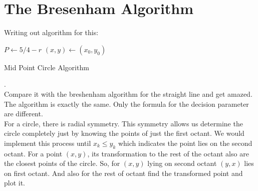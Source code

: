\documentclass[a4paper,12pt,oneside]{book}
\begin{document}
 \section{The Bresenham Algorithm}
Writing out algorithm for this:

\begin{algorithm}[H]
		
	\SetAlgoLined
	$P\gets 5/4-r$\;
	$(x,y) \gets (x_0,y_0)$\;
	\caption{Mid Point Circle Algorithm}
\end{algorithm}

.\\[.2cm]

Compare it with the breshenham algorithm for the straight line and get amazed. The algorithm is exactly the same. Only the formula for the decision parameter are different.\\

  For a circle, there is radial symmetry. This symmetry allows us determine the circle completely just by knowing the points of just the first octant. We would implement this process until $x_k\leq y_k$ which indicates the point lies on the second octant. For a point $(x,y)$, its transformation to the rest of the octant also are the closest points of the circle. So, for $(x,y)$ lying on second octant $(y,x)$ lies on  first octant. And also for the rest of octant find the transformed point and plot it.
\end{document}
